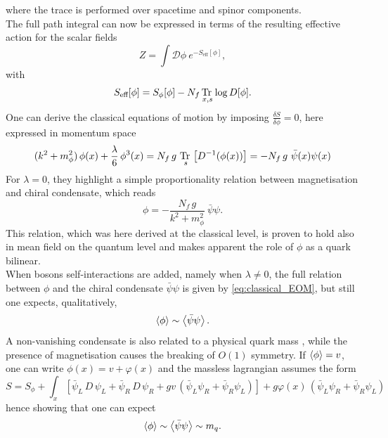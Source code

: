where the trace is performed over spacetime and spinor components. \\ 
The full path integral can now be expressed in terms of the resulting effective action for the scalar fields
\begin{equation*}
    Z = \int \mathcal{D}\phi \ e^{-S_\text{eff}[\phi]},
\end{equation*}
with
\begin{equation}
    S_\text{eff}[\phi] = S_{\phi}[\phi] - N_f \, \underset{x,s}{\operatorname{\text{Tr} \,}} \log D[\phi].
    \label{eq:effective_action_no_fermions}
\end{equation}
One can derive the classical equations of motion by imposing $\frac{\delta S}{\delta \phi} = 0$, here expressed in momentum space
\begin{equation}
     (k^2 + m_\phi^2) \, \phi(x) + \frac{\lambda}{6} \, \phi^3(x) = N_f \, g \ \underset{s}{\tr} \left[D^{-1}(\phi(x))\right] = - N_f \, g \ \bar\psi(x) \psi(x)
     \label{eq:classical_EOM_full}
\end{equation}
For $\lambda = 0$, they highlight a simple proportionality relation between magnetisation and chiral condensate, which reads
\begin{equation}
    \phi = - \frac{N_f \, g}{k^2 + m_\phi^2} \ \bar \psi\psi.
    \label{eq:classical_EOM}
\end{equation}
This relation, which was here derived at the classical level, is proven to hold also in mean field on the quantum level \cite{Ayala2021QCDDescriptions} and makes apparent the role of $\phi$ as a quark bilinear. \\
When bosons self-interactions are added, namely when $\lambda \neq 0$, the full relation between $\phi$ and the chiral condensate $\bar\psi\psi$ is given by \eqref{eq:classical_EOM}, but still one expects, qualitatively,
\begin{equation}
    \left\langle \phi \right\rangle \sim \left\langle \bar\psi\psi \right\rangle.
    \label{eq:qualitative_relation_condensate_magnetisation}
\end{equation}
A non-vanishing condensate is also related to a physical quark mass \cite{Ayala2021QCDDescriptions,MANOHAR1984189}, while the presence of magnetisation causes the breaking of $O(1)$ symmetry.
If $\left\langle \phi \right\rangle = v$, one can write $\phi(x) = v + \varphi(x)$ and the massless lagrangian assumes the form 
\begin{equation}
	S = S_\phi +  \int_x \left[\bar\psi_L \, D \, \psi_L + \bar\psi_R \, D \, \psi_R + gv \, \left(\bar\psi_L\psi_R + \bar\psi_R\psi_L\right)\right] + g\varphi(x) \, \left(\bar\psi_L\psi_R + \bar\psi_R\psi_L\right)
	\label{eq:background_field}
\end{equation}
hence showing that one can expect
\begin{equation}
    \left\langle \phi \right\rangle \sim \left\langle \bar\psi\psi \right\rangle \sim m_q.
    \label{eq:qualitative_relation_condensate_magnetisation_mass}
\end{equation}


